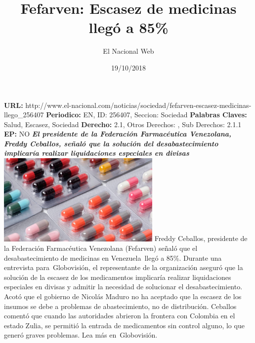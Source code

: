\documentclass{article}%
\title{\textbf{Fefarven: Escasez de medicinas llegó a 85\%}}%
\author{El Nacional Web}%
\date{19/10/2018}%
\begin{document}
%
\normalsize%
\maketitle%
\textbf{URL: }%
http://www.el{-}nacional.com/noticias/sociedad/fefarven{-}escasez{-}medicinas{-}llego\_256407\newline%
%
\textbf{Periodico: }%
EN, %
ID: %
256407, %
Seccion: %
Sociedad\newline%
%
\textbf{Palabras Claves: }%
Salud, Escasez, Sociedad\newline%
%
\textbf{Derecho: }%
2.1, %
Otros Derechos: %
, %
Sub Derechos: %
2.1.1\newline%
%
\textbf{EP: }%
NO\newline%
\newline%
%
\textbf{\textit{El presidente de la Federación Farmacéutica Venezolana, Freddy Ceballos, señaló que la solución del desabastecimiento implicaría realizar liquidaciones especiales en divisas}}%
\newline%
\newline%
%
\includegraphics[width=300px]{262.jpg}%
\newline%
%
Freddy Ceballos, presidente de la Federación Farmacéutica Venezolana (Fefarven) señaló que el desabastecimiento de medicinas en Venezuela~llegó a 85\%.%
\newline%
%
Durante una entrevista para~Globovisión, el representante de la organización aseguró que la solución de la escasez de los medicamentos implicaría realizar liquidaciones especiales en divisas y admitir la necesidad de solucionar el desabastecimiento.%
\newline%
%
Acotó que el gobierno de Nicolás Maduro no ha aceptado que la escasez de los insumos se debe a problemas de abastecimiento, no de distribución.%
\newline%
%
Ceballos comentó que cuando las autoridades abrieron la frontera con Colombia en el estado Zulia, se permitió la entrada de medicamentos sin control alguno, lo que generó graves problemas.%
\newline%
%
Lea más en~Globovisión.%
\newline%
%
\end{document}
